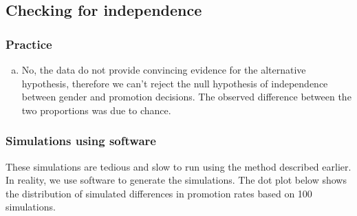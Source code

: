 \documentclass[slidestop,compress,mathserif]{beamer}
\begin{document}

\subsection{Checking for independence}


\begin{frame}
\frametitle{Practice}


\begin{enumerate}[(a)]
\item No, the data do not provide convincing evidence for the alternative hypothesis, therefore we can't reject the null hypothesis of independence between gender and promotion decisions. The observed difference between the two proportions was due to chance.
\end{enumerate}

\end{frame}


\begin{frame}
\frametitle{Simulations using software}

These simulations are tedious and slow to run using the method described earlier. In reality, we use software to generate the simulations. The dot plot below shows the distribution of simulated differences in promotion rates based on 100 simulations.

\begin{center}
\end{center}

\end{frame}


\end{document}
